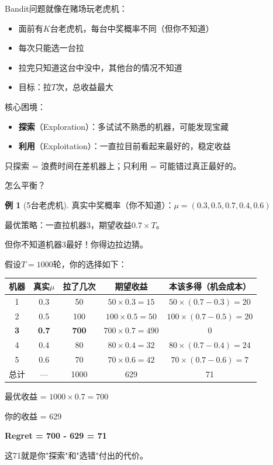 \documentclass[11pt,a4paper]{article}
\theoremstyle{definition}
\newtheorem{example}{例}[section]
\begin{document}
\begin{plainwords}
Bandit问题就像在赌场玩老虎机：

\begin{itemize}
    \item 面前有$K$台老虎机，每台中奖概率不同（但你不知道）
    \item 每次只能选一台拉
    \item 拉完只知道这台中没中，其他台的情况不知道
    \item 目标：拉$T$次，总收益最大
\end{itemize}

核心困境：
\begin{itemize}
    \item \textbf{探索}（Exploration）：多试试不熟悉的机器，可能发现宝藏
    \item \textbf{利用}（Exploitation）：一直拉目前看起来最好的，稳定收益
\end{itemize}

只探索 = 浪费时间在差机器上；只利用 = 可能错过真正最好的。

怎么平衡？
\end{plainwords}

\begin{example}[5台老虎机]
真实中奖概率（你不知道）：$\mu = (0.3, 0.5, 0.7, 0.4, 0.6)$

最优策略：一直拉机器3，期望收益$0.7 \times T$。

但你不知道机器3最好！你得边拉边猜。
\end{example}

\begin{calculation}[Regret的来源]
假设$T=1000$轮，你的选择如下：

\begin{center}
\begin{tabular}{c|c|c|c|c}
\toprule
机器 & 真实$\mu$ & 拉了几次 & 期望收益 & 本该多得（机会成本） \\
\midrule
1 & 0.3 & 50 & $50 \times 0.3 = 15$ & $50 \times (0.7-0.3) = 20$ \\
2 & 0.5 & 100 & $100 \times 0.5 = 50$ & $100 \times (0.7-0.5) = 20$ \\
\textbf{3} & \textbf{0.7} & \textbf{700} & $700 \times 0.7 = 490$ & $0$ \\
4 & 0.4 & 80 & $80 \times 0.4 = 32$ & $80 \times (0.7-0.4) = 24$ \\
5 & 0.6 & 70 & $70 \times 0.6 = 42$ & $70 \times (0.7-0.6) = 7$ \\
\midrule
总计 & — & 1000 & 629 & 71 \\
\bottomrule
\end{tabular}
\end{center}

最优收益 = $1000 \times 0.7 = 700$

你的收益 = 629

\textbf{Regret = 700 - 629 = 71}

这71就是你"探索"和"选错"付出的代价。
\end{calculation}
\end{document}
